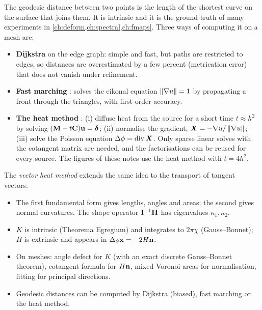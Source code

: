 The geodesic distance between two points is the length of the shortest curve on the surface that
joins them. It is intrinsic and it is the ground truth of many experiments in
\cref{ch:deform,ch:spectral,ch:fmaps}. Three ways of computing it on a mesh are:
\begin{itemize}
  \item \textbf{Dijkstra} on the edge graph: simple and fast, but paths are restricted to edges, so
  distances are overestimated by a few percent (metrication error) that does not vanish under
  refinement.
  \item \textbf{Fast marching} \citep{Kimmel1998}: solves the eikonal equation
  $\left\lVert \nabla u\right\rVert=1$ by propagating a front through the triangles, with first-order accuracy.
  \item \textbf{The heat method} \citep{Crane2013}: (i) diffuse heat from the source for a short
  time $t\approx h^2$ by solving $(\mathbf{M}-t\mathbf{C})\mathbf{u}=\boldsymbol{\delta}$; (ii) normalise the gradient,
  $\bm X=-\nabla u/\left\lVert \nabla u\right\rVert$; (iii) solve the Poisson equation $\Delta\phi=\operatorname{div}\bm X$. Only
  sparse linear solves with the cotangent matrix are needed, and the factorisations can be reused
  for every source. The figures of these notes use the heat method with $t=4h^2$.
\end{itemize}
The \emph{vector heat method} \citep{Sharp2019} extends the same idea to the transport of tangent
vectors.

\begin{keypoints}
\begin{itemize}[leftmargin=*]
  \item The first fundamental form gives lengths, angles and areas; the second gives normal
  curvatures. The shape operator $\mathbf{I}^{-1}\mathbf{II}$ has eigenvalues $\kappa_1,\kappa_2$.
  \item $K$ is intrinsic (Theorema Egregium) and integrates to $2\pi\chi$ (Gauss--Bonnet); $H$ is
  extrinsic and appears in $\Delta_S\mathbf{x}=-2H\mathbf{n}$.
  \item On meshes: angle defect for $K$ (with an exact discrete Gauss--Bonnet theorem), cotangent
  formula for $H\mathbf{n}$, mixed Voronoi areas for normalisation, fitting for principal directions.
  \item Geodesic distances can be computed by Dijkstra (biased), fast marching or the heat method.
\end{itemize}
\end{keypoints}

